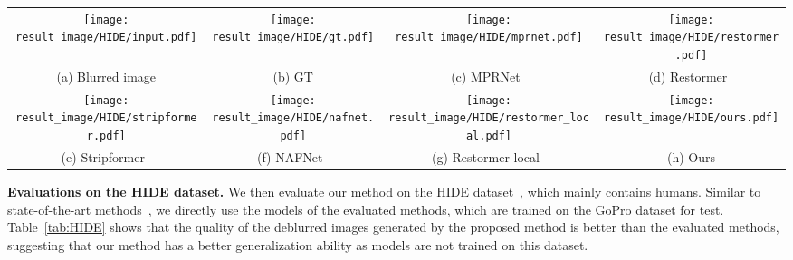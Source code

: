 \documentclass[10pt,twocolumn,letterpaper]{article}
\begin{document}
\begin{figure*}[t]
\footnotesize
\centering
    \begin{tabular}{cccc}
    \texttt{[image: result\_image/HIDE/input.pdf]}&\hspace{-4.5mm}
    \texttt{[image: result\_image/HIDE/gt.pdf]}&\hspace{-4.5mm}
    \texttt{[image: result\_image/HIDE/mprnet.pdf]}&\hspace{-4.5mm}
    \texttt{[image: result\_image/HIDE/restormer.pdf]}\\
    \hspace{-4.5mm}(a) Blurred image &\hspace{-4.5mm} (b) GT &\hspace{-4.5mm}(c) MPRNet~\cite{MPRNet} &\hspace{-4.5mm}(d) Restormer~\cite{Restormer}\\
    \texttt{[image: result\_image/HIDE/stripformer.pdf]} &\hspace{-4.5mm}
    \texttt{[image: result\_image/HIDE/nafnet.pdf]} &\hspace{-4.5mm}
    \texttt{[image: result\_image/HIDE/restormer\_local.pdf]} &\hspace{-4.5mm}
    \texttt{[image: result\_image/HIDE/ours.pdf]}\\
\hspace{-4.5mm} (e) Stripformer~\cite{Stripformer}  &\hspace{-4.5mm} (f) NAFNet~\cite{NAFNet} &\hspace{-4.5mm} (g) Restormer-local~\cite{TLC} &\hspace{-4.5mm} (h) Ours
    \end{tabular}
\vspace{-2mm}
    \caption{Deblurred results on the HIDE dataset~\cite{HIDE}. The deblurred results in (c)-(g) still contain significant blur effects. The proposed method generates much clearer images.}
    \label{fig:HIDE_result}
\vspace{-4mm}
\end{figure*}
\vspace{-2mm}
{\flushleft \textbf{Evaluations on the HIDE dataset.}}
We then evaluate our method on the HIDE dataset~\cite{HIDE}, which mainly contains humans.
Similar to state-of-the-art methods~\cite{MPRNet,MIMO}, we directly use the models of the evaluated methods, which are trained on the GoPro dataset for test.
Table~\ref{tab:HIDE} shows that the quality of the deblurred images generated by the proposed method is better than the evaluated methods, suggesting that our method has a better generalization ability as models are not trained on this dataset.
\end{document}
